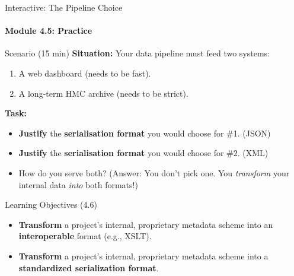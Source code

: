 \begin{frame}{Interactive: The Pipeline Choice}
    \framesubtitle{Module 4.5: Practice}
    \begin{block}{Scenario (15 min)}
        \textbf{Situation:} Your data pipeline must feed two systems:
        \begin{enumerate}
            \item A web dashboard (needs to be fast).
            \item A long-term HMC archive (needs to be strict).
        \end{enumerate}
        \pause
        \textbf{Task:}
        \begin{itemize}
            \item \textbf{Justify} the \textbf{serialisation format} you would choose for \#1. (JSON)
            \pause
            \item \textbf{Justify} the \textbf{serialisation format} you would choose for \#2. (XML)
            \pause
            \item How do you serve both? (Answer: You don't pick one. You \emph{transform} your internal data \textit{into} both formats!)
        \end{itemize}
    \end{block}
\end{frame}

\begin{frame}{Learning Objectives (4.6)}
    \begin{itemize}
        \item \textbf{Transform} a project's internal, proprietary metadata scheme into an \textbf{interoperable} format (e.g., XSLT).
        \item \textbf{Transform} a project's internal, proprietary metadata scheme into a \textbf{standardized serialization format}.
    \end{itemize}
\end{frame}

